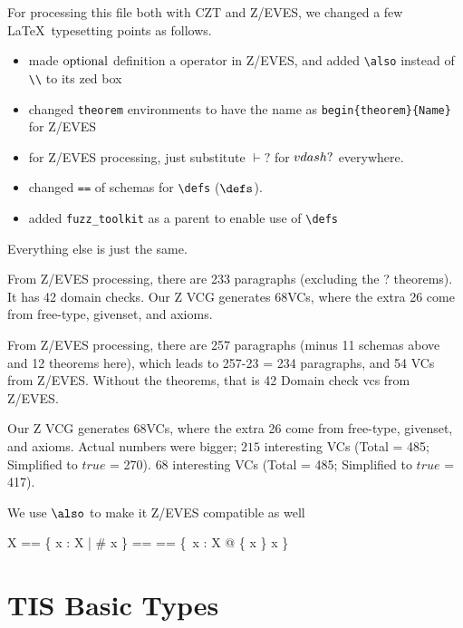 
For processing this file both with CZT and Z/EVES, we changed a few \LaTeX\ typesetting points as follows.
\begin{itemize}
  \item made $\mathop{\rm optional}$ definition a operator in Z/EVES, and added \verb+\also+ instead of \verb+\\+ to its zed box
  \item changed \verb+theorem+ environments to have the name as \verb'begin{theorem}{Name}' for Z/EVES
  \item for Z/EVES processing, just substitute $\vdash?$ for $\\vdash?$ everywhere.
  \item changed \verb+==+ of schemas for \verb+\defs+ ($\defs$).
  \item added \verb+fuzz_toolkit+ as a parent to enable use of \verb+\defs+
\end{itemize}
Everything else is just the same.

From Z/EVES processing, there are 233 paragraphs (excluding the \vdash? theorems).
It has 42 domain checks. Our Z VCG generates 68VCs, where the extra 26 come from free-type, givenset, and axioms.

From Z/EVES processing, there are 257 paragraphs (minus 11 schemas above and 12 theorems here),
which leads to 257-23 = 234 paragraphs, and 54 VCs from Z/EVES. Without the theorems,
that is 42 Domain check vcs from Z/EVES. 

Our Z VCG generates 68VCs, where the extra 26 come from free-type, givenset, and axioms.
Actual numbers were bigger;
$215$ interesting VCs (Total = 485; Simplified to $true$ = 270).
$68$ interesting VCs (Total = 485; Simplified to $true$ = 417).


We use $\also$ to make it Z/EVES compatible as well

\begin{zed}
        \Optional X == \{ x : \finset X | \# x \}
\also      \Nil[X] == \emptyset[X]
\also      \The[X] == \{~x : X @ \{ x \} \mapsto x \}
\end{zed}

\section{TIS Basic Types}

